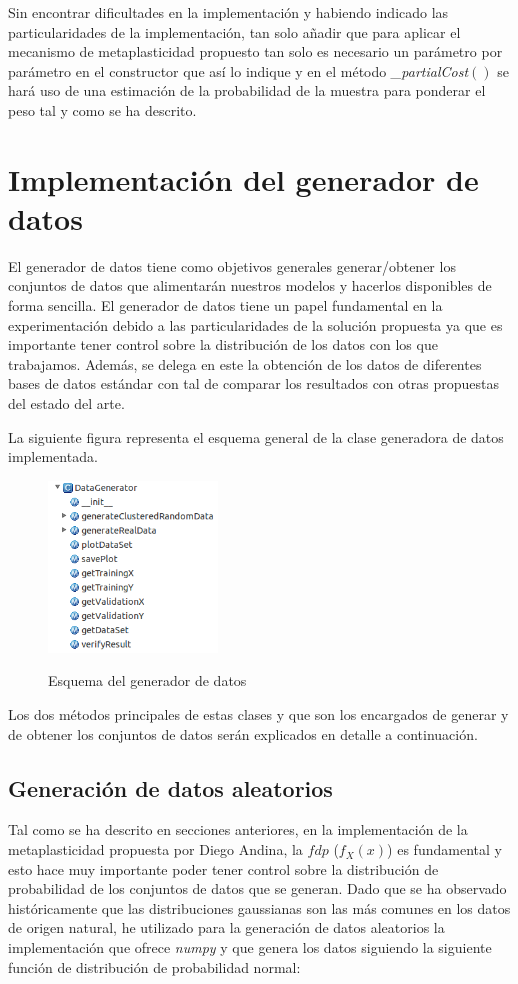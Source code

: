 \documentclass[10pt,a4paper]{report}
\begin{document}
Sin encontrar dificultades en la implementación y habiendo indicado las particularidades de la implementación, tan solo añadir que para aplicar el mecanismo de metaplasticidad propuesto tan solo es necesario un parámetro por parámetro en el constructor que así lo indique y en el método \textit{\_partialCost$()$} se hará uso de una estimación de la probabilidad de la muestra para ponderar el peso tal y como se ha descrito.


\section{Implementación del generador de datos}
El generador de datos tiene como objetivos generales generar/obtener los conjuntos de datos que alimentarán nuestros modelos y hacerlos disponibles de forma sencilla. El generador de datos tiene un papel fundamental en la experimentación debido a las particularidades de la solución propuesta ya que es importante tener control sobre la distribución de los datos con los que trabajamos. Además, se delega en este la obtención de los datos de diferentes bases de datos estándar con tal de comparar los resultados con otras propuestas del estado del arte.

La siguiente figura representa el esquema general de la clase generadora de datos implementada.
\begin{figure}[b]{}
    \centering
    \includegraphics[width=0.4\textwidth]{img/GeneradorEsquema.png}
    \label{fig:EsquemaGenerador}
    \caption{Esquema del generador de datos}
\end{figure}
Los dos métodos principales de estas clases y que son los encargados de generar y de obtener los conjuntos de datos serán explicados en detalle a continuación.

\subsection{Generación de datos aleatorios}
Tal como se ha descrito en secciones anteriores, en la implementación de la metaplasticidad propuesta por Diego Andina\citep{Andina2009}, la $fdp$ ($f_X(x)$) es fundamental y esto hace muy importante poder tener control sobre la distribución de probabilidad de los conjuntos de datos que se generan. Dado que se ha observado históricamente que las distribuciones gaussianas son las más comunes en los datos de origen natural, he utilizado para la generación de datos aleatorios la implementación que ofrece \textit{numpy} y que genera los datos siguiendo la siguiente función de distribución de probabilidad normal: 
\end{document}
